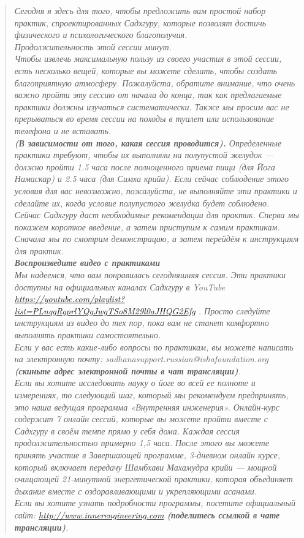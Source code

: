 \begin{quote}\emph{
Сегодня я здесь для того, чтобы предложить вам простой набор практик,
спроектированных Садхгуру, которые позволят достичь физического и
психологического благополучия.
\\[3pt]
Продолжительность этой сессии \underline{\qquad} минут.
\\[3pt]
Чтобы извлечь максимальную пользу из своего участия в этой сессии, есть несколько вещей, которые вы можете сделать, чтобы создать благоприятную атмосферу. Пожалуйста, обратите внимание, что очень важно пройти эту сессию от начала до конца, так как предлагаемые практики должны изучаться систематически. Также мы просим вас не прерываться во время сессии на походы в туалет или использование телефона и не вставать.
\\[3pt]
\textbf{(В зависимости от того, какая сессия проводится).} Определенные практики требуют, чтобы их выполняли на полупустой желудок — должно пройти 1.5 часа после полноценного приема пищи (для Йога Намаскар) и 2.5 часа (для Симха крийи). Если сейчас соблюдение этого условия для вас невозможно, пожалуйста, не выполняйте эти практики и сделайте их, когда условие полупустого желудка будет соблюдено.
\\[3pt]
Сейчас Садхгуру даст необходимые рекомендации для практик. Сперва мы покажем короткое введение, а затем приступим к самим практикам. Сначала мы по смотрим демонстрацию, а затем перейдём к инструкциям для практик.
\\[15pt]
\textbf{Воспроизведите видео с практиками}
\\[15pt]
Мы надеемся, что вам понравилась сегодняшняя сессия. Эти практики
доступны на официальных каналах Садхгуру в YouTube 
\\ \href{https://youtube.com/playlist?list=PLnqgRgprlYQgJwgTSo8M29l0aJHQG2Efg}{\tiny https://youtube.com/playlist?list=PLnqgRgprlYQgJwgTSo8M29l0aJHQG2Efg} . Просто следуйте
инструкциям из видео до тех пор, пока вам не станет комфортно выполнять
практики самостоятельно.
\\[3pt]
Если у вас есть какие-либо вопросы по практикам, вы можете написать на
электронную почту: sadhanasupport.russian@ishafoundation.org \textbf{(скиньте адрес электронной почты в чат трансляции)}.
\\[3pt]
Если вы хотите исследовать науку о йоге во всей ее полноте и измерениях,
то следующий шаг, который мы рекомендуем предпринять, это наша
ведущая программа «Внутренняя инженерия». Онлайн-курс содержит 7
онлайн сессий, которые вы можете пройти вместе с Садхгуру в своём
темпе прямо у себя дома. Каждая сессия продолжительностью примерно
1,5 часа. После этого вы можете принять участие в Завершающей
программе, 3-дневном онлайн курсе, который включает передачу
Шамбхави Махамудра крийи — мощной очищающей 21-минутной
энергетической практики, которая объединяет дыхание вместе с
оздоравливающими и укрепляющими асанами.
\\[3pt]
Если вы хотите узнать подробности программы, посетите официальный
сайт: \href{http://www.innerengineering.com}{\small http://www.innerengineering.com} \textbf{(поделитесь ссылкой в чате трансляции)}.
}\end{quote}

